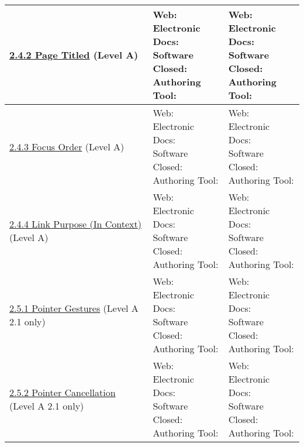 \documentclass[a4paper]{report}
\begin{document}
\begin{longtable}{|l|l|l|}
        \hline
        \href{http://www.w3.org/TR/WCAG20/#navigation-mechanisms-title}{2.4.2 Page Titled} (Level A) & \makecell{Web: \\ Electronic Docs: \\ Software \\ Closed: \\ Authoring Tool:} & \makecell{Web: \\ Electronic Docs: \\ Software \\ Closed: \\ Authoring Tool:}\\
        \hline
        \href{http://www.w3.org/TR/WCAG20/#navigation-mechanisms-focus-order}{2.4.3 Focus Order} (Level A) & \makecell{Web: \\ Electronic Docs: \\ Software \\ Closed: \\ Authoring Tool:} & \makecell{Web: \\ Electronic Docs: \\ Software \\ Closed: \\ Authoring Tool:}\\
        \hline
        \href{http://www.w3.org/TR/WCAG20/#navigation-mechanisms-refs}{2.4.4 Link Purpose (In Context)} (Level A) & \makecell{Web: \\ Electronic Docs: \\ Software \\ Closed: \\ Authoring Tool:} & \makecell{Web: \\ Electronic Docs: \\ Software \\ Closed: \\ Authoring Tool:}\\
        \hline
        \href{https://www.w3.org/TR/WCAG21/#pointer-gestures}{2.5.1 Pointer Gestures} (Level A 2.1 only) & \makecell{Web: \\ Electronic Docs: \\ Software \\ Closed: \\ Authoring Tool:} & \makecell{Web: \\ Electronic Docs: \\ Software \\ Closed: \\ Authoring Tool:}\\
        \hline
        \href{https://www.w3.org/TR/WCAG21/#pointer-cancellation}{2.5.2 Pointer Cancellation} (Level A 2.1 only) & \makecell{Web: \\ Electronic Docs: \\ Software \\ Closed: \\ Authoring Tool:} & \makecell{Web: \\ Electronic Docs: \\ Software \\ Closed: \\ Authoring Tool:}\\

\end{longtable}
\end{document}
